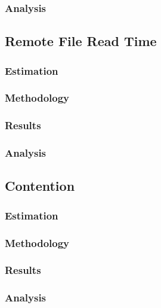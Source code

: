 \subsubsection{Analysis}

\subsection{Remote File Read Time}

\subsubsection{Estimation}

\subsubsection{Methodology}

\subsubsection{Results}

\subsubsection{Analysis}

\subsection{Contention}

\subsubsection{Estimation}

\subsubsection{Methodology}

\subsubsection{Results}

\subsubsection{Analysis}
